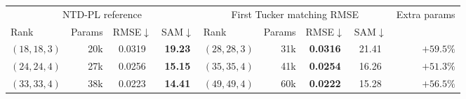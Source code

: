 \begin{tabular}{@{}l r cc l r cc r@{}}
\toprule
\multicolumn{4}{c}{NTD-PL reference} &
\multicolumn{4}{c}{First Tucker matching RMSE} & Extra params \\
\cmidrule(lr){1-4}\cmidrule(lr){5-8}
Rank & Params & RMSE$\downarrow$ & SAM$\downarrow$ &
Rank & Params & RMSE$\downarrow$ & SAM$\downarrow$ & \\
\midrule
\((18,18,3)\) & 20k & 0.0319 & \textbf{19.23} & \((28,28,3)\) & 31k & \textbf{0.0316} & 21.41 & \(+59.5\%\) \\
\((24,24,4)\) & 27k & 0.0256 & \textbf{15.15} & \((35,35,4)\) & 41k & \textbf{0.0254} & 16.26 & \(+51.3\%\) \\
\((33,33,4)\) & 38k & 0.0223 & \textbf{14.41} & \((49,49,4)\) & 60k & \textbf{0.0222} & 15.28 & \(+56.5\%\) \\
\bottomrule
\end{tabular}
